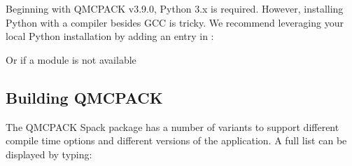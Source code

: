 \documentclass[letterpaper,10pt,english]{sphinxmanual}
\begin{document}
Beginning with QMCPACK v3.9.0, Python 3.x is required. However,
installing Python with a compiler besides GCC is tricky. We recommend
leveraging your local Python installation by adding an entry in
:

\begin{sphinxVerbatim}[commandchars=\\\{\}]
        
\end{sphinxVerbatim}

Or if a module is not available

\begin{sphinxVerbatim}[commandchars=\\\{\}]
         
    
\end{sphinxVerbatim}


\subsection{Building QMCPACK}
\label{\detokenize{installation:id4}}
The QMCPACK Spack package has a number of variants to support different compile time
options and different versions of the application. A full list can be displayed by typing:
\end{document}
